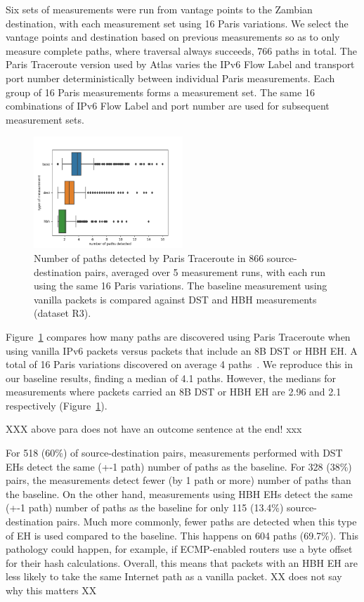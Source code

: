 \documentclass[conference]{IEEEtran}
\begin{document}
Six sets of measurements were run from  vantage points to the Zambian destination, with each measurement set using 16 Paris variations. We select the vantage points and destination based on previous measurements so as to only measure complete paths, where traversal always succeeds, 766 paths in total. The Paris Traceroute version used by Atlas varies the IPv6 Flow Label and transport port number deterministically between individual Paris measurements. Each group of 16 Paris measurements forms a measurement set. The same 16 combinations of IPv6 Flow Label and port number are used for subsequent measurement sets.

\begin{figure}
\centering
  \includegraphics[width=0.5\textwidth]{boxplot-paths-detected.png}
  \caption{Number of paths detected by Paris Traceroute in 866 source-destination pairs, averaged over 5 measurement runs, with each run using the same 16 Paris variations. The baseline measurement using vanilla packets is compared against DST and HBH measurements (dataset R3).}
  \label{fig:paths-detected}
\end{figure}

Figure~\ref{fig:paths-detected} compares how many paths are discovered using Paris Traceroute when using vanilla IPv6 packets versus packets that include an 8B DST or HBH EH.
A total of 16 Paris variations discovered on average 4 paths~\cite{augustin2006avoiding}. We reproduce this in our baseline results, finding a median of 4.1 paths. However, the medians for measurements where packets carried an 8B DST or HBH EH are 2.96 and 2.1 respectively (Figure~\ref{fig:paths-detected}).

XXX above para does not have an outcome sentence at the end! xxx

For 518 (60\%) of source-destination pairs, measurements performed with DST EHs detect the same (+-1 path) number of paths as the baseline. For 328 (38\%) pairs, the measurements detect fewer (by 1 path or more) number of paths than the baseline. On the other hand, measurements using HBH EHs detect the same (+-1 path) number of paths as the baseline for only 115 (13.4\%) source-destination pairs. Much more commonly, fewer paths are detected when this type of EH is used compared to the baseline. This happens on 604 paths (69.7\%). This pathology could happen, for example, if ECMP-enabled routers use a byte offset for their hash calculations. Overall, this means that packets with an HBH EH are less likely to take the same Internet path as a vanilla packet.
XX does not say why this matters XX
\end{document}
